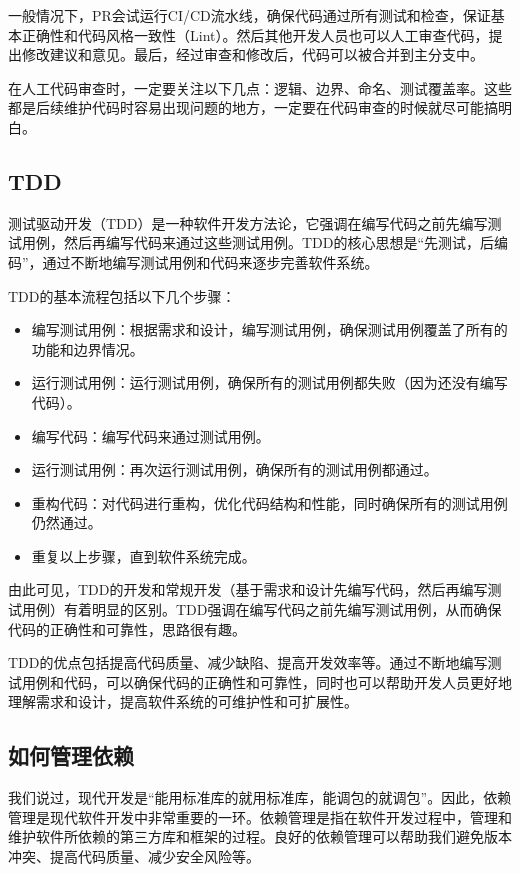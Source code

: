 一般情况下，PR会试运行CI/CD流水线，确保代码通过所有测试和检查，保证基本正确性和代码风格一致性（Lint）。然后其他开发人员也可以人工审查代码，提出修改建议和意见。最后，经过审查和修改后，代码可以被合并到主分支中。

在人工代码审查时，一定要关注以下几点：逻辑、边界、命名、测试覆盖率。这些都是后续维护代码时容易出现问题的地方，一定要在代码审查的时候就尽可能搞明白。

\subsection{TDD}

测试驱动开发（TDD）是一种软件开发方法论，它强调在编写代码之前先编写测试用例，然后再编写代码来通过这些测试用例。TDD的核心思想是“先测试，后编码”，通过不断地编写测试用例和代码来逐步完善软件系统。

TDD的基本流程包括以下几个步骤：
\begin{itemize}
  \item 编写测试用例：根据需求和设计，编写测试用例，确保测试用例覆盖了所有的功能和边界情况。
  \item 运行测试用例：运行测试用例，确保所有的测试用例都失败（因为还没有编写代码）。
  \item 编写代码：编写代码来通过测试用例。
  \item 运行测试用例：再次运行测试用例，确保所有的测试用例都通过。
  \item 重构代码：对代码进行重构，优化代码结构和性能，同时确保所有的测试用例仍然通过。
  \item 重复以上步骤，直到软件系统完成。
\end{itemize}

由此可见，TDD的开发和常规开发（基于需求和设计先编写代码，然后再编写测试用例）有着明显的区别。TDD强调在编写代码之前先编写测试用例，从而确保代码的正确性和可靠性，思路很有趣。

TDD的优点包括提高代码质量、减少缺陷、提高开发效率等。通过不断地编写测试用例和代码，可以确保代码的正确性和可靠性，同时也可以帮助开发人员更好地理解需求和设计，提高软件系统的可维护性和可扩展性。

\subsection{如何管理依赖}

我们说过，现代开发是“能用标准库的就用标准库，能调包的就调包”。因此，依赖管理是现代软件开发中非常重要的一环。依赖管理是指在软件开发过程中，管理和维护软件所依赖的第三方库和框架的过程。良好的依赖管理可以帮助我们避免版本冲突、提高代码质量、减少安全风险等。

